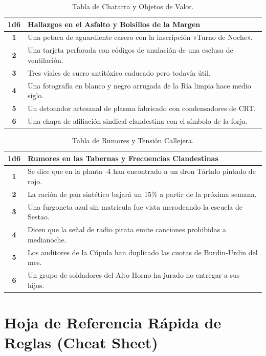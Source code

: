 \begin{table}[htbp]
\centering
\small
\begin{tabularx}{\textwidth}{c X}
\toprule
\textbf{1d6} & \textbf{Hallazgos en el Asfalto y Bolsillos de la Margen} \\
\midrule
\textbf{1} & Una petaca de aguardiente casero con la inscripción «Turno de Noche». \\
\textbf{2} & Una tarjeta perforada con códigos de anulación de una esclusa de ventilación. \\
\textbf{3} & Tres viales de suero antitóxico caducado pero todavía útil. \\
\textbf{4} & Una fotografía en blanco y negro arrugada de la Ría limpia hace medio siglo. \\
\textbf{5} & Un detonador artesanal de plasma fabricado con condensadores de CRT. \\
\textbf{6} & Una chapa de afiliación sindical clandestina con el símbolo de la forja. \\
\bottomrule
\end{tabularx}
\caption{Tabla de Chatarra y Objetos de Valor.}
\end{table}

\begin{table}[htbp]
\centering
\small
\begin{tabularx}{\textwidth}{c X}
\toprule
\textbf{1d6} & \textbf{Rumores en las Tabernas y Frecuencias Clandestinas} \\
\midrule
\textbf{1} & Se dice que en la planta -4 han encontrado a un dron Tártalo pintado de rojo. \\
\textbf{2} & La ración de pan sintético bajará un 15\% a partir de la próxima semana. \\
\textbf{3} & Una furgoneta azul sin matrícula fue vista merodeando la escuela de Sestao. \\
\textbf{4} & Dicen que la señal de radio pirata emite canciones prohibidas a medianoche. \\
\textbf{5} & Los auditores de la Cúpula han duplicado las cuotas de Burdin-Urdin del mes. \\
\textbf{6} & Un grupo de soldadores del Alto Horno ha jurado no entregar a sus hijos. \\
\bottomrule
\end{tabularx}
\caption{Tabla de Rumores y Tensión Callejera.}
\end{table}

\newpage

\section{Hoja de Referencia Rápida de Reglas (Cheat Sheet)}

